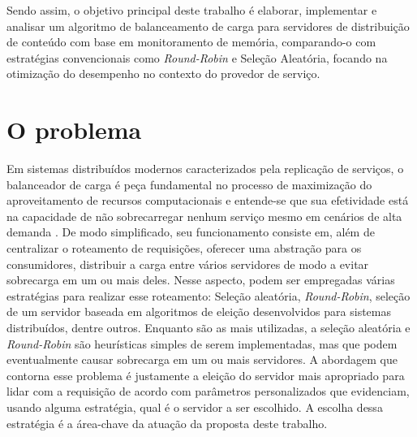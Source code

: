 Sendo assim, o objetivo principal deste trabalho é elaborar, implementar e analisar um algoritmo de balanceamento de carga para servidores de distribuição de conteúdo com base em monitoramento de memória, comparando-o com estratégias convencionais como \textit{Round-Robin} e Seleção Aleatória, focando na otimização do desempenho no contexto do provedor de serviço.

\section{O problema} \label{sec:problema}

Em sistemas distribuídos modernos caracterizados pela replicação de serviços, o balanceador de carga é peça fundamental no processo de maximização do aproveitamento de recursos computacionais e entende-se que sua efetividade está na capacidade de não sobrecarregar nenhum serviço mesmo em cenários de alta demanda \cite{dos2019balanceamento}. De modo simplificado, seu funcionamento consiste em, além de centralizar o roteamento de requisições, oferecer uma abstração para os consumidores, distribuir a carga entre vários servidores de modo a evitar sobrecarga em um ou mais deles. Nesse aspecto, podem ser empregadas várias estratégias para realizar esse roteamento: Seleção aleatória, \textit{Round-Robin}, seleção de um servidor baseada em algoritmos de eleição desenvolvidos para sistemas distribuídos, dentre outros. Enquanto são as mais utilizadas, a seleção aleatória e \textit{Round-Robin} são heurísticas simples de serem implementadas, mas que podem eventualmente causar sobrecarga em um ou mais servidores. A abordagem que contorna esse problema é justamente a eleição do servidor mais apropriado para lidar com a requisição de acordo com parâmetros personalizados que evidenciam, usando alguma estratégia, qual é o servidor a ser escolhido. A escolha dessa estratégia é a área-chave da atuação da proposta deste trabalho.

